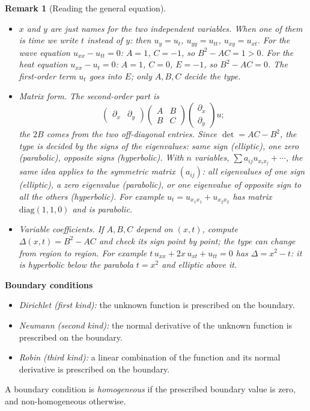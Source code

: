 \documentclass[11pt,a4paper]{article}
\numberwithin{equation}{section}
\theoremstyle{spacedplain}
\theoremstyle{spaceddefinition}
\theoremstyle{spacedremark}
\newtheorem{remark}[theorem]{Remark}
\newcommand{\step}[1]{\par\addvspace{0.6em}\noindent\textbf{#1}\par\nobreak}
\begin{document}
\begin{remark}[Reading the general equation]
\leavevmode
\begin{itemize}
  \item \(x\) and \(y\) are just names for the two independent
    variables.  When one of them is time we write \(t\) instead of
    \(y\): then \(u_y=u_t\), \(u_{yy}=u_{tt}\), \(u_{xy}=u_{xt}\).
    For the wave equation \(u_{xx}-u_{tt}=0\): \(A=1\), \(C=-1\), so
    \(B^2-AC=1>0\).  For the heat equation \(u_{xx}-u_t=0\): \(A=1\),
    \(C=0\), \(E=-1\), so \(B^2-AC=0\).  The first-order term \(u_t\)
    goes into \(E\); only \(A,B,C\) decide the type.
  \item \emph{Matrix form.}  The second-order part is
    \[
      \begin{pmatrix}\partial_x&\partial_y\end{pmatrix}
      \begin{pmatrix}A&B\\B&C\end{pmatrix}
      \begin{pmatrix}\partial_x\\ \partial_y\end{pmatrix}u ;
    \]
    the \(2B\) comes from the two off-diagonal entries.  Since
    \(\det=AC-B^2\), the type is decided by the signs of the
    eigenvalues: same sign (elliptic), one zero (parabolic), opposite
    signs (hyperbolic).  With \(n\) variables,
    \(\sum a_{ij}u_{x_ix_j}+\cdots\), the same idea applies to the
    symmetric matrix \((a_{ij})\): all eigenvalues of one sign
    (elliptic), a zero eigenvalue (parabolic), or one eigenvalue of
    opposite sign to all the others (hyperbolic).  For example
    \(u_t=u_{x_1x_1}+u_{x_2x_2}\) has matrix \(\mathrm{diag}(1,1,0)\) and
    is parabolic.
  \item \emph{Variable coefficients.}  If \(A,B,C\) depend on
    \((x,t)\), compute \(\Delta(x,t)=B^2-AC\) and check its sign point
    by point; the type can change from region to region.  For example
    \(t\,u_{xx}+2x\,u_{xt}+u_{tt}=0\) has \(\Delta=x^2-t\): it is
    hyperbolic below the parabola \(t=x^2\) and elliptic above it.
\end{itemize}
\end{remark}

\step{Boundary conditions}

\begin{itemize}
  \item \emph{Dirichlet (first kind):} the unknown function is
    prescribed on the boundary.
  \item \emph{Neumann (second kind):} the normal derivative of the
    unknown function is prescribed on the boundary.
  \item \emph{Robin (third kind):} a linear combination of the function
    and its normal derivative is prescribed on the boundary.
\end{itemize}
A boundary condition is \emph{homogeneous} if the prescribed boundary
value is zero, and non-homogeneous otherwise.
\end{document}
